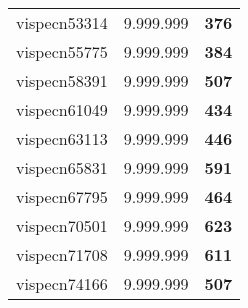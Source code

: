 \begin{tabular}{cc||c}
vispecn53314     & 9.999.999        & {\bf 376}       \\ 
vispecn55775     & 9.999.999        & {\bf 384}       \\ 
vispecn58391     & 9.999.999        & {\bf 507}       \\ 
vispecn61049     & 9.999.999        & {\bf 434}       \\ 
vispecn63113     & 9.999.999        & {\bf 446}       \\ 
vispecn65831     & 9.999.999        & {\bf 591}       \\ 
vispecn67795     & 9.999.999        & {\bf 464}       \\ 
vispecn70501     & 9.999.999        & {\bf 623}       \\ 
vispecn71708     & 9.999.999        & {\bf 611}       \\ 
vispecn74166     & 9.999.999        & {\bf 507}       \\ 
\end{tabular}
